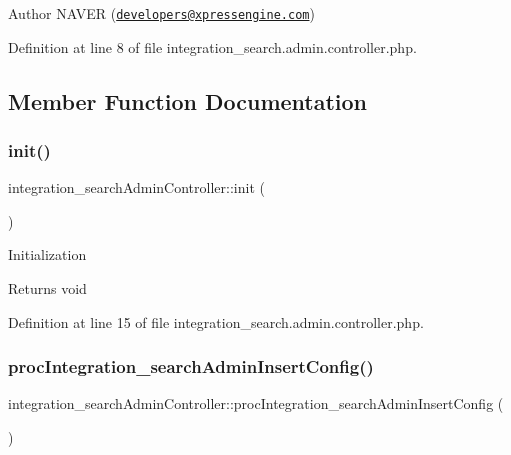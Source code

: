 \begin{DoxyAuthor}{Author}
N\+A\+V\+ER (\href{mailto:developers@xpressengine.com}{\tt developers@xpressengine.\+com}) 
\end{DoxyAuthor}


Definition at line 8 of file integration\+\_\+search.\+admin.\+controller.\+php.



\subsection{Member Function Documentation}
\hypertarget{classintegration__searchAdminController_af0bce7d6e800c43283d7ed9d59129888}{}\label{classintegration__searchAdminController_af0bce7d6e800c43283d7ed9d59129888} 
\subsubsection{\texorpdfstring{init()}{init()}}
{\footnotesize\ttfamily integration\+\_\+search\+Admin\+Controller\+::init (\begin{DoxyParamCaption}{ }\end{DoxyParamCaption})}

Initialization

\begin{DoxyReturn}{Returns}
void 
\end{DoxyReturn}


Definition at line 15 of file integration\+\_\+search.\+admin.\+controller.\+php.

\hypertarget{classintegration__searchAdminController_aa5f35f169a96654f8fd8b9d824479693}{}\label{classintegration__searchAdminController_aa5f35f169a96654f8fd8b9d824479693} 
\subsubsection{\texorpdfstring{proc\+Integration\+\_\+search\+Admin\+Insert\+Config()}{procIntegration\_searchAdminInsertConfig()}}
{\footnotesize\ttfamily integration\+\_\+search\+Admin\+Controller\+::proc\+Integration\+\_\+search\+Admin\+Insert\+Config (\begin{DoxyParamCaption}{ }\end{DoxyParamCaption})}


